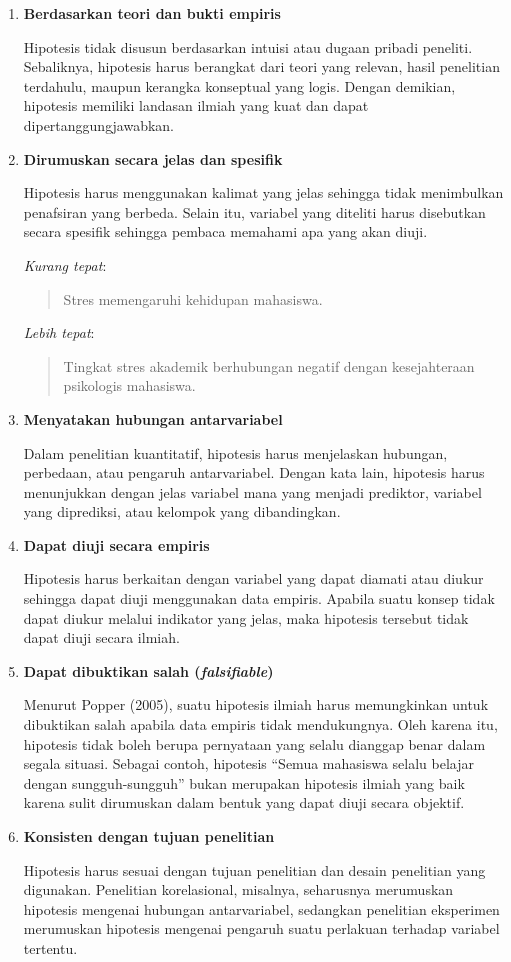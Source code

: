 \documentclass[
  indonesian,
  letterpaper,
  DIV=11,
  numbers=noendperiod]{scrreprt}
\begin{document}
\begin{enumerate}
\def\labelenumi{\arabic{enumi}.}
\item
  \textbf{Berdasarkan teori dan bukti empiris}

  Hipotesis tidak disusun berdasarkan intuisi atau dugaan pribadi
  peneliti. Sebaliknya, hipotesis harus berangkat dari teori yang
  relevan, hasil penelitian terdahulu, maupun kerangka konseptual yang
  logis. Dengan demikian, hipotesis memiliki landasan ilmiah yang kuat
  dan dapat dipertanggungjawabkan.
\item
  \textbf{Dirumuskan secara jelas dan spesifik}

  Hipotesis harus menggunakan kalimat yang jelas sehingga tidak
  menimbulkan penafsiran yang berbeda. Selain itu, variabel yang
  diteliti harus disebutkan secara spesifik sehingga pembaca memahami
  apa yang akan diuji.

  \emph{Kurang tepat}:

  \begin{quote}
  Stres memengaruhi kehidupan mahasiswa.
  \end{quote}

  \emph{Lebih tepat}:

  \begin{quote}
  Tingkat stres akademik berhubungan negatif dengan kesejahteraan
  psikologis mahasiswa.
  \end{quote}
\item
  \textbf{Menyatakan hubungan antarvariabel}

  Dalam penelitian kuantitatif, hipotesis harus menjelaskan hubungan,
  perbedaan, atau pengaruh antarvariabel. Dengan kata lain, hipotesis
  harus menunjukkan dengan jelas variabel mana yang menjadi prediktor,
  variabel yang diprediksi, atau kelompok yang dibandingkan.
\item
  \textbf{Dapat diuji secara empiris}

  Hipotesis harus berkaitan dengan variabel yang dapat diamati atau
  diukur sehingga dapat diuji menggunakan data empiris. Apabila suatu
  konsep tidak dapat diukur melalui indikator yang jelas, maka hipotesis
  tersebut tidak dapat diuji secara ilmiah.
\item
  \textbf{Dapat dibuktikan salah (\emph{falsifiable})}

  Menurut Popper (2005), suatu hipotesis ilmiah harus memungkinkan untuk
  dibuktikan salah apabila data empiris tidak mendukungnya. Oleh karena
  itu, hipotesis tidak boleh berupa pernyataan yang selalu dianggap
  benar dalam segala situasi. Sebagai contoh, hipotesis ``Semua
  mahasiswa selalu belajar dengan sungguh-sungguh'' bukan merupakan
  hipotesis ilmiah yang baik karena sulit dirumuskan dalam bentuk yang
  dapat diuji secara objektif.
\item
  \textbf{Konsisten dengan tujuan penelitian}

  Hipotesis harus sesuai dengan tujuan penelitian dan desain penelitian
  yang digunakan. Penelitian korelasional, misalnya, seharusnya
  merumuskan hipotesis mengenai hubungan antarvariabel, sedangkan
  penelitian eksperimen merumuskan hipotesis mengenai pengaruh suatu
  perlakuan terhadap variabel tertentu.
\end{enumerate}
\end{document}
